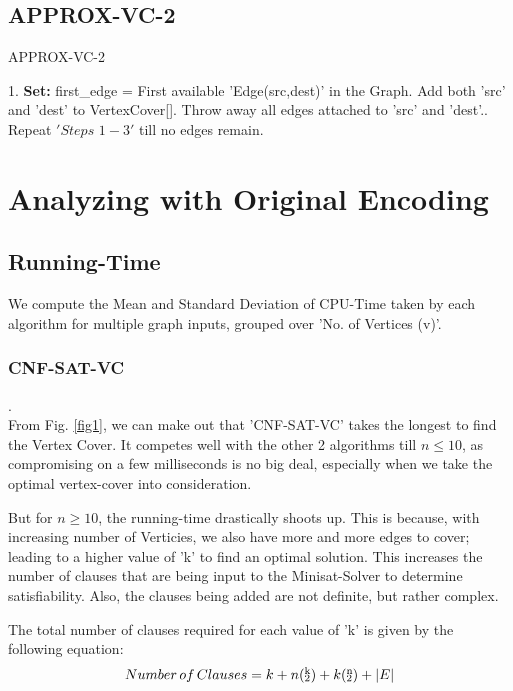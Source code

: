\documentclass[11pt]{llncs}
\def\SPSB#1#2{\rlap{\textsuperscript{#1}}\textsubscript{#2}}
\begin{document}
\subsection{APPROX-VC-2}
	\vspace{-2mm}

	\begin{algorithm}[H]
		\caption{APPROX-VC-2 \cite{prj_pdf}}\label{getgpx}

		\DontPrintSemicolon
		\SetAlgoLined


		1. \textbf{Set:} first\_edge =  First available 'Edge(src,dest)' in the Graph. Add both 'src' and 'dest' to VertexCover[]. Throw away all edges attached to 'src' and 'dest'.. Repeat $'Steps \,\, 1-3'$ till no edges remain.\;
	\end{algorithm}




\section{Analyzing with Original Encoding\cite{a4_pdf}}
    \subsection{Running-Time}

	\noindent We compute the Mean and Standard Deviation of CPU-Time taken by each algorithm for multiple graph inputs, grouped over 'No. of Vertices (v)'.

	\subsubsection{CNF-SAT-VC}.\\
		
		From Fig. \ref{fig1}, we can make out that 'CNF-SAT-VC' takes the longest to find the Vertex Cover.
		It competes well with the other 2 algorithms till $n \leq 10$, as compromising on a few milliseconds is no big deal, especially when we take the optimal vertex-cover into consideration.
		
		But for $n \geq 10$, the running-time drastically shoots up. This is because, with increasing number of Verticies, we also have more and more edges to cover; leading to a higher value of 'k' to find an optimal solution. This increases the number of clauses that are being input to the Minisat-Solver to determine satisfiability. Also, the clauses being added are not definite, but rather complex.

		The total number of clauses required for each value of 'k' is given by the following equation: \cite{a4_pdf}
		\begin{equation}
			Number \, of \, Clauses = k + n(\SPSB{k}{2}) + k(\SPSB{n}{2}) + |E|
		\end{equation}
\end{document}
